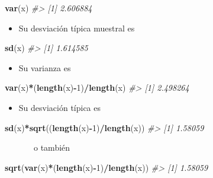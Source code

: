 \documentclass[
]{book}
\newenvironment{Shaded}{\begin{snugshade}}{\end{snugshade}}
\newcommand{\CommentTok}[1]{\textcolor[rgb]{0.56,0.35,0.01}{\textit{#1}}}
\newcommand{\DecValTok}[1]{\textcolor[rgb]{0.00,0.00,0.81}{#1}}
\newcommand{\KeywordTok}[1]{\textcolor[rgb]{0.13,0.29,0.53}{\textbf{#1}}}
\newcommand{\NormalTok}[1]{#1}
\newcommand{\OperatorTok}[1]{\textcolor[rgb]{0.81,0.36,0.00}{\textbf{#1}}}
\providecommand{\tightlist}{%
  \setlength{\itemsep}{0pt}\setlength{\parskip}{0pt}}
\theoremstyle{definition}
\theoremstyle{definition}
\theoremstyle{definition}
\theoremstyle{remark}
\begin{document}
\begin{Shaded}
\begin{Highlighting}[]
\KeywordTok{var}\NormalTok{(x) }
\CommentTok{\#\textgreater{} [1] 2.606884}
\end{Highlighting}
\end{Shaded}

\begin{itemize}
\tightlist
\item
  Su desviación típica muestral es
\end{itemize}

\begin{Shaded}
\begin{Highlighting}[]
\KeywordTok{sd}\NormalTok{(x) }
\CommentTok{\#\textgreater{} [1] 1.614585}
\end{Highlighting}
\end{Shaded}

\begin{itemize}
\tightlist
\item
  Su varianza es
\end{itemize}

\begin{Shaded}
\begin{Highlighting}[]
\KeywordTok{var}\NormalTok{(x)}\OperatorTok{*}\NormalTok{(}\KeywordTok{length}\NormalTok{(x)}\OperatorTok{{-}}\DecValTok{1}\NormalTok{)}\OperatorTok{/}\KeywordTok{length}\NormalTok{(x)}
\CommentTok{\#\textgreater{} [1] 2.498264}
\end{Highlighting}
\end{Shaded}

\begin{itemize}
\tightlist
\item
  Su desviación típica es
\end{itemize}

\begin{Shaded}
\begin{Highlighting}[]
\KeywordTok{sd}\NormalTok{(x)}\OperatorTok{*}\KeywordTok{sqrt}\NormalTok{((}\KeywordTok{length}\NormalTok{(x)}\OperatorTok{{-}}\DecValTok{1}\NormalTok{)}\OperatorTok{/}\KeywordTok{length}\NormalTok{(x))}
\CommentTok{\#\textgreater{} [1] 1.58059}
\end{Highlighting}
\end{Shaded}

~~~~~~~o también

\begin{Shaded}
\begin{Highlighting}[]
\KeywordTok{sqrt}\NormalTok{(}\KeywordTok{var}\NormalTok{(x)}\OperatorTok{*}\NormalTok{(}\KeywordTok{length}\NormalTok{(x)}\OperatorTok{{-}}\DecValTok{1}\NormalTok{)}\OperatorTok{/}\KeywordTok{length}\NormalTok{(x))}
\CommentTok{\#\textgreater{} [1] 1.58059}
\end{Highlighting}
\end{Shaded}
\end{document}
